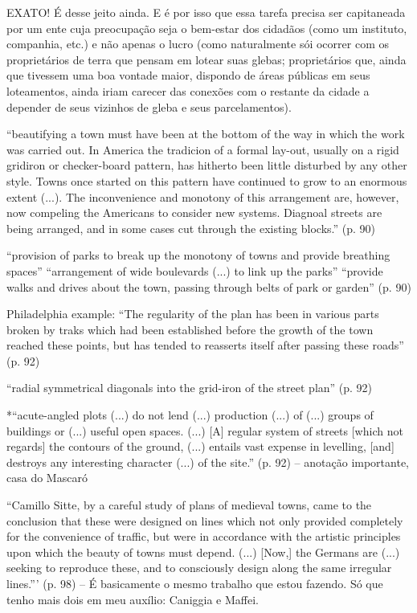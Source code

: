 \documentclass[12pt, a4paper]{book} %
\begin{document}
        EXATO! É desse jeito ainda. E é por isso que essa tarefa precisa ser capitaneada por um ente cuja preocupação seja o bem-estar dos cidadãos (como um instituto, companhia, etc.) e não apenas o lucro (como naturalmente sói ocorrer com os proprietários de terra que pensam em lotear suas glebas; proprietários que, ainda que tivessem uma boa vontade maior, dispondo de áreas públicas em seus loteamentos, ainda iriam carecer das conexões com o restante da cidade a depender de seus vizinhos de gleba e seus parcelamentos).

        ``beautifying a town must have been at the bottom of the way in which the work was carried out. In America the tradicion of a formal lay-out, usually on a rigid gridiron or checker-board pattern, has hitherto been little disturbed by any other style. Towns once started on this pattern have continued to grow to an enormous extent (...). The inconvenience and monotony of this arrangement are, however, now compeling the Americans to consider new systems. Diagnoal streets are being arranged, and in some cases cut through the existing blocks.'' (p. 90) %

        ``provision of parks to break up the monotony of towns and provide breathing spaces''
        ``arrangement of wide boulevards (...) to link up the parks''
        ``provide walks and drives about the town, passing through belts of park or garden'' (p. 90)

        Philadelphia example: ``The regularity of the plan has been in various parts broken by traks which had been established before the growth of the town reached these points, but has tended to reasserts itself after passing these roads'' (p. 92)

        ``radial symmetrical diagonals into the grid-iron of the street plan'' (p. 92)

        *``acute-angled plots (...) do not lend (...) production (...) of (...) groups of buildings or (...) useful open spaces. (...) [A] regular system of streets [which not regards] the contours of the ground, (...) entails vast expense in levelling, [and] destroys any interesting character (...) of the site.'' (p. 92) – anotação importante, casa do Mascaró

        ``Camillo Sitte, by a careful study of plans of medieval towns, came to the conclusion that these were designed on lines which not only provided completely for the convenience of traffic, but were in accordance with the artistic principles upon which the beauty of towns must depend. (...) [Now,] the Germans are (...) seeking to reproduce these, and to consciously design along the same irregular lines.''' (p. 98) – É basicamente o mesmo trabalho que estou fazendo. Só que tenho mais dois em meu auxílio: Caniggia e Maffei.
\end{document}
